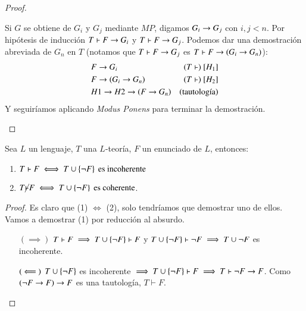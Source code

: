 \begin{proof}
\begin{itemize}
        Si $G$ se obtiene de $G_i$ y $G_j$ mediante $MP$, digamos $G_i \rightarrow G_j$ con $i,j < n$. Por hipótesis de inducción $T \vdash F \rightarrow G_i$ y $T \vdash F \rightarrow G_j$. Podemos dar una demostración abreviada de $G_n$ en $T$ (notamos que $T \vdash F \rightarrow G_j$ es $T \vdash F \rightarrow (G_i \rightarrow G_n)$):
        \begin{align}
            &F \rightarrow G_i\ &(T\vdash)\ [H_1]\\
            &F \rightarrow (G_i \rightarrow G_n)\ &(T\vdash)\ [H_2]\\
            &H1 \rightarrow H2 \rightarrow (F \rightarrow G_n) &(\text{tautología})
        \end{align}
        Y seguiríamos aplicando \textit{Modus Ponens} para terminar la demostración.
    \end{itemize}
\end{proof}


\begin{cor} \label{cor:td1}
    Sea $L$ un lenguaje, $T$ una $L$-teoría, $F$ un enunciado de $L$, entonces:
    \begin{enumerate}[(1)]
        \item $T \vdash F \iff T \cup \left\{\neg F\right\} \text{ es incoherente}$
        \item $T \cancel{\vdash} F \iff T \cup \left\{\neg F\right\} \text{ es coherente}$.
    \end{enumerate}
\end{cor}

\begin{proof}
    Es claro que (1) $\iff$ (2), solo tendríamos que demostrar uno de ellos. Vamos a demostrar (1) por reducción al absurdo.\\
    \begin{itemize}
        \item[$(\implies)$] $T \vdash F \implies T \cup\left\{\neg F\right\} \vdash F$ y $T \cup \left\{\neg F\right\} \vdash \neg F \implies T \cup {\neg F} $ es incoherente.
        \item[$(\ \Longleftarrow\ )$] $T \cup \left\{\neg F\right\}$ es incoherente $\implies T \cup \left\{\neg F\right\} \vdash F \implies T \vdash \neg F \rightarrow F$. Como $(\neg F \rightarrow F) \rightarrow F$ es una tautología, $T \vdash F$.
    \end{itemize}
\end{proof}


